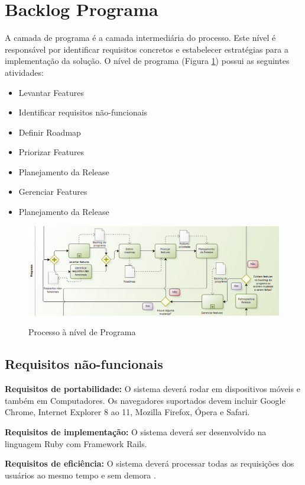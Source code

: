\section {Backlog Programa}
A camada de programa é a camada intermediária do processo. Este nível é responsável por identificar requisitos concretos e estabelecer estratégias para a implementação da solução. O nível de programa (Figura \ref{img:programa}) possui as seguintes atividades:

\begin{itemize}
\item Levantar Features
\item Identificar requisitos não-funcionais
\item Definir Roadmap
\item Priorizar Features
\item Planejamento da Release
\item Gerenciar Features
\item Planejamento da Release
\end{itemize}

\FloatBarrier
\begin{figure}[!htpd]
		\centering
		\includegraphics[scale=0.4]{figuras/programa}
		\label{img:programa}
		\caption{Processo à nível de Programa}
\end{figure}

\subsection{Requisitos não-funcionais}

\textbf{Requisitos de portabilidade:} O sistema deverá rodar em dispositivos móveis e também em Computadores. Os navegadores suportados devem incluir Google Chrome, Internet Explorer 8 ao 11, Mozilla Firefox, Ópera e Safari.

\textbf{Requisitos de implementação:} O sistema deverá ser desenvolvido na linguagem Ruby com Framework Rails.

\textbf{Requisitos de eficiência:} O sistema deverá processar todas as requisições dos usuários ao mesmo tempo e sem demora .

